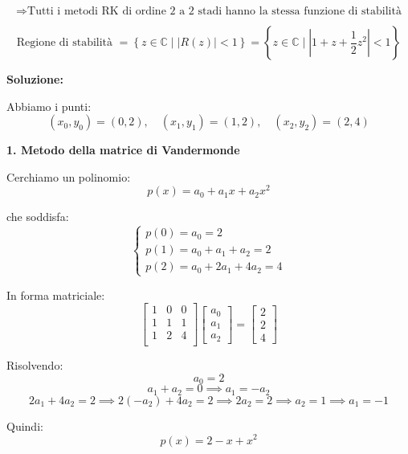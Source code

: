 \documentclass[12pt,a4paper]{article}
\begin{document}
\[
\Rightarrow \text{Tutti i metodi RK di ordine 2 a 2 stadi hanno la stessa funzione di stabilità}
\]

\[
\text{Regione di stabilità } = \left\{ z \in \mathbb{C} \mid |R(z)| < 1 \right\}
= \left\{ z \in \mathbb{C} \mid \left|1 + z + \frac{1}{2}z^2 \right| < 1 \right\}
\]


\newpage
{}

\vspace{0.5em}

\textbf{Soluzione:}

Abbiamo i punti:  
\[
(x_0, y_0) = (0,2), \quad (x_1, y_1) = (1,2), \quad (x_2, y_2) = (2,4)
\]

\bigskip

\textbf{1. Metodo della matrice di Vandermonde}

Cerchiamo un polinomio:
\[
p(x) = a_0 + a_1 x + a_2 x^2
\]

che soddisfa:
\[
\begin{cases}
p(0) = a_0 = 2 \\
p(1) = a_0 + a_1 + a_2 = 2 \\
p(2) = a_0 + 2a_1 + 4a_2 = 4
\end{cases}
\]

In forma matriciale:
\[
\begin{bmatrix}
1 & 0 & 0 \\
1 & 1 & 1 \\
1 & 2 & 4 \\
\end{bmatrix}
\begin{bmatrix}
a_0 \\ a_1 \\ a_2
\end{bmatrix}
=
\begin{bmatrix}
2 \\ 2 \\ 4
\end{bmatrix}
\]

Risolvendo:
\[
a_0 = 2
\]
\[
a_1 + a_2 = 0 \implies a_1 = -a_2
\]
\[
2a_1 + 4a_2 = 2 \implies 2(-a_2) + 4a_2 = 2 \implies 2a_2 = 2 \implies a_2 = 1 \implies a_1 = -1
\]

Quindi:
\[
p(x) = 2 - x + x^2
\]

\bigskip
\end{document}
